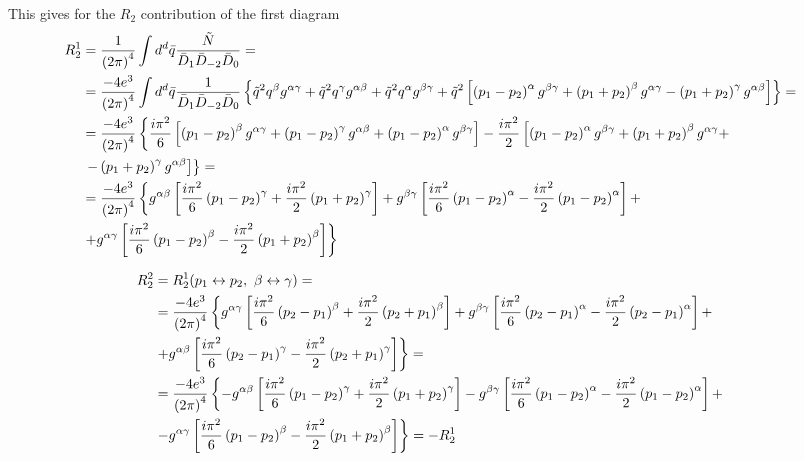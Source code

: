 This gives for the $R_2$ contribution of the first diagram
\begin{align*}
R_2^1 & = \frac{1}{\left( 2\pi \right)^4} \int d^d\bar{q} \frac{\tilde{N}}{\bar{D}_1\bar{D}_{-2}\bar{D}_0} = & \\
& = \frac{-4e^3}{\left( 2\pi \right)^4} \int d^d \bar{q} \frac{1}{\bar{D}_1\bar{D}_{-2}\bar{D}_0} \left\lbrace \tilde{q}^2q^{\beta}g^{\alpha\gamma} + \tilde{q}^2q^{\gamma}g^{\alpha\beta} + \tilde{q}^2q^{\alpha}g^{\beta\gamma} + \tilde{q}^2 \left[ \left( p_1 - p_2 \right)^{\alpha} g^{\beta\gamma} + \left( p_1 + p_2 \right)^{\beta} g^{\alpha\gamma} - \left( p_1 + p_2 \right)^{\gamma} g^{\alpha\beta} \right] \right\rbrace = & \\
& = \frac{-4e^3}{\left( 2\pi \right)^4} \left\lbrace \frac{i\pi^2}{6} \left[ \left( p_1-p_2 \right)^{\beta}g^{\alpha\gamma} + \left( p_1-p_2 \right)^{\gamma}g^{\alpha\beta} + \left( p_1-p_2 \right)^{\alpha}g^{\beta\gamma} \right] - \frac{i\pi^2}{2} \left[ \left( p_1-p_2 \right)^{\alpha} g^{\beta\gamma} + \left( p_1+p_2 \right)^{\beta} g^{\alpha\gamma} + \right. \right. & \\
& \left. \left. - \left( p_1+p_2 \right)^{\gamma} g^{\alpha\beta} \right] \right\rbrace = & \\
& = \frac{-4e^3}{\left( 2\pi \right)^4} \left\lbrace g^{\alpha\beta} \left[ \frac{i\pi^2}{6} \left( p_1-p_2 \right)^{\gamma} + \frac{i\pi^2}{2} \left( p_1+p_2 \right)^{\gamma} \right] + g^{\beta\gamma} \left[ \frac{i\pi^2}{6} \left( p_1-p_2 \right)^{\alpha} - \frac{i\pi^2}{2} \left( p_1-p_2 \right)^{\alpha} \right] + \right. & \\
& \left. + g^{\alpha\gamma} \left[ \frac{i\pi^2}{6} \left( p_1-p_2 \right)^{\beta} - \frac{i\pi^2}{2} \left( p_1+p_2 \right)^{\beta} \right] \right\rbrace &
\end{align*}

\begin{align*}
R_2^2 & = R_2^1(p_1 \leftrightarrow p_2, \ \beta \leftrightarrow \gamma) = & \\
& = \frac{-4e^3}{\left( 2\pi \right)^4} \left\lbrace g^{\alpha\gamma} \left[ \frac{i\pi^2}{6} \left( p_2-p_1 \right)^{\beta} + \frac{i\pi^2}{2} \left( p_2+p_1 \right)^{\beta} \right] + g^{\beta\gamma} \left[ \frac{i\pi^2}{6} \left( p_2-p_1 \right)^{\alpha} - \frac{i\pi^2}{2} \left( p_2-p_1 \right)^{\alpha} \right] + \right. & \\
& \left. + g^{\alpha\beta} \left[ \frac{i\pi^2}{6} \left( p_2-p_1 \right)^{\gamma} - \frac{i\pi^2}{2} \left( p_2+p_1 \right)^{\gamma} \right] \right\rbrace = & \\
& = \frac{-4e^3}{\left( 2\pi \right)^4} \left\lbrace -g^{\alpha\beta} \left[ \frac{i\pi^2}{6} \left( p_1-p_2 \right)^{\gamma} + \frac{i\pi^2}{2} \left( p_1+p_2 \right)^{\gamma} \right] - g^{\beta\gamma} \left[ \frac{i\pi^2}{6} \left( p_1-p_2 \right)^{\alpha} - \frac{i\pi^2}{2} \left( p_1-p_2 \right)^{\alpha} \right] + \right. & \\
& \left. - g^{\alpha\gamma} \left[ \frac{i\pi^2}{6} \left( p_1-p_2 \right)^{\beta} - \frac{i\pi^2}{2} \left( p_1+p_2 \right)^{\beta} \right] \right\rbrace = -R_2^1 &
\end{align*}

